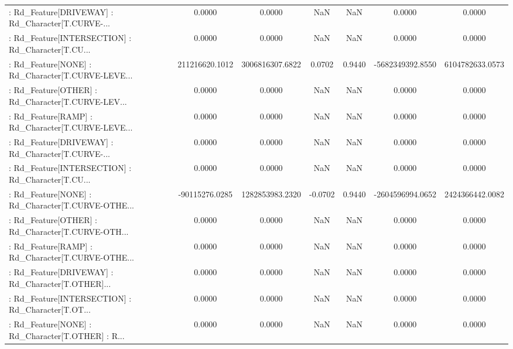 \begin{longtable}{p{4cm}cccccc}
 : Rd\_Feature[DRIVEWAY] : Rd\_Character[T.CURVE-... &            0.0000 &            0.0000 &     NaN &          NaN &             0.0000 &            0.0000 \\
 : Rd\_Feature[INTERSECTION] : Rd\_Character[T.CU... &            0.0000 &            0.0000 &     NaN &          NaN &             0.0000 &            0.0000 \\
 : Rd\_Feature[NONE] : Rd\_Character[T.CURVE-LEVE... &    211216620.1012 &   3006816307.6822 &  0.0702 &       0.9440 &   -5682349392.8550 &   6104782633.0573 \\
 : Rd\_Feature[OTHER] : Rd\_Character[T.CURVE-LEV... &            0.0000 &            0.0000 &     NaN &          NaN &             0.0000 &            0.0000 \\
 : Rd\_Feature[RAMP] : Rd\_Character[T.CURVE-LEVE... &            0.0000 &            0.0000 &     NaN &          NaN &             0.0000 &            0.0000 \\
 : Rd\_Feature[DRIVEWAY] : Rd\_Character[T.CURVE-... &            0.0000 &            0.0000 &     NaN &          NaN &             0.0000 &            0.0000 \\
 : Rd\_Feature[INTERSECTION] : Rd\_Character[T.CU... &            0.0000 &            0.0000 &     NaN &          NaN &             0.0000 &            0.0000 \\
 : Rd\_Feature[NONE] : Rd\_Character[T.CURVE-OTHE... &    -90115276.0285 &   1282853983.2320 & -0.0702 &       0.9440 &   -2604596994.0652 &   2424366442.0082 \\
 : Rd\_Feature[OTHER] : Rd\_Character[T.CURVE-OTH... &            0.0000 &            0.0000 &     NaN &          NaN &             0.0000 &            0.0000 \\
 : Rd\_Feature[RAMP] : Rd\_Character[T.CURVE-OTHE... &            0.0000 &            0.0000 &     NaN &          NaN &             0.0000 &            0.0000 \\
 : Rd\_Feature[DRIVEWAY] : Rd\_Character[T.OTHER]... &            0.0000 &            0.0000 &     NaN &          NaN &             0.0000 &            0.0000 \\
 : Rd\_Feature[INTERSECTION] : Rd\_Character[T.OT... &            0.0000 &            0.0000 &     NaN &          NaN &             0.0000 &            0.0000 \\
 : Rd\_Feature[NONE] : Rd\_Character[T.OTHER] : R... &            0.0000 &            0.0000 &     NaN &          NaN &             0.0000 &            0.0000 \\

\end{longtable}
